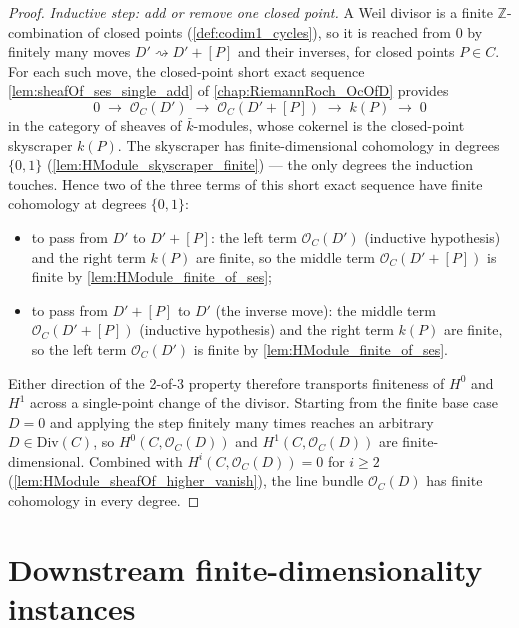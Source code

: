 \begin{proof}
  \emph{Inductive step: add or remove one closed point.} A Weil divisor
  is a finite \(\mathbb Z\)-combination of closed points
  (\cref{def:codim1_cycles}), so it is reached from \(0\) by finitely
  many moves \(D' \rightsquigarrow D' + [P]\) and their inverses, for
  closed points \(P \in C\). For each such move, the closed-point short
  exact sequence \cref{lem:sheafOf_ses_single_add} of
  \cref{chap:RiemannRoch_OcOfD} provides
  \[
    0 \;\longrightarrow\; \mathcal O_C(D')
    \;\longrightarrow\; \mathcal O_C(D' + [P])
    \;\longrightarrow\; k(P)
    \;\longrightarrow\; 0
  \]
  in the category of sheaves of \(\bar k\)-modules, whose cokernel is
  the closed-point skyscraper \(k(P)\). The skyscraper has
  finite-dimensional cohomology in degrees \(\{0, 1\}\)
  (\cref{lem:HModule_skyscraper_finite}) --- the only degrees the
  induction touches. Hence two of the three terms of this short exact
  sequence have finite cohomology at degrees \(\{0, 1\}\):
  \begin{itemize}
    \item to pass from \(D'\) to \(D' + [P]\): the left term
      \(\mathcal O_C(D')\) (inductive hypothesis) and the right term
      \(k(P)\) are finite, so the middle term
      \(\mathcal O_C(D' + [P])\) is finite by
      \cref{lem:HModule_finite_of_ses};
    \item to pass from \(D' + [P]\) to \(D'\) (the inverse move): the
      middle term \(\mathcal O_C(D' + [P])\) (inductive hypothesis) and
      the right term \(k(P)\) are finite, so the left term
      \(\mathcal O_C(D')\) is finite by
      \cref{lem:HModule_finite_of_ses}.
  \end{itemize}
  Either direction of the 2-of-3 property therefore transports
  finiteness of \(H^0\) and \(H^1\) across a single-point change of the
  divisor. Starting from the finite base case \(D = 0\) and applying the
  step finitely many times reaches an arbitrary \(D \in \mathrm{Div}(C)\),
  so \(H^0(C, \mathcal O_C(D))\) and \(H^1(C, \mathcal O_C(D))\) are
  finite-dimensional. Combined with
  \(H^i(C, \mathcal O_C(D)) = 0\) for \(i \ge 2\)
  (\cref{lem:HModule_sheafOf_higher_vanish}), the line bundle
  \(\mathcal O_C(D)\) has finite cohomology in every degree.
\end{proof}

\section{Downstream finite-dimensionality instances}
\label{sec:SerreFiniteness_instances}

